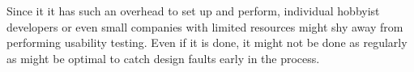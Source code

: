 Since it it has such an overhead to set up and perform, individual hobbyist
developers or even small companies with limited resources might shy away from
performing usability testing. Even if it is done, it might not be done as
regularly as might be optimal to catch design faults early in the process.



